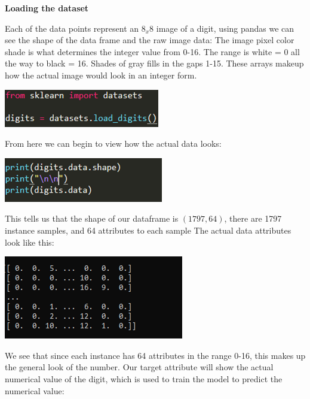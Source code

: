 \documentclass[a4paper,12pt]{report}
\newcommand{\msection}[1]{\noindent\textbf{#1}}
\begin{document}
\msection{Loading the dataset}

Each of the data points represent an $8_x8$ image of a digit, using pandas we can see the shape of the data frame and the raw image data:
The image pixel color shade is what determines the integer value from 0-16. The range is white = 0 all the way to black = 16. Shades of gray fills in the gaps 1-15. These arrays makeup how the actual image would look in an integer form.	

\begin{center}
    \captionsetup{type=figure}
    \includegraphics[width=.5\linewidth]{media/loadDidgit.png}
\end{center}

From here we can  begin to view how the actual data looks:

\begin{center}
    \captionsetup{type=figure}
    \includegraphics[width=.5\linewidth]{media/digitprintpng.png}
\end{center}

This tells us that the shape of our dataframe is $(1797, 64)$, there are 1797 instance samples, and 64 attributes to each sample
The actual data attributes look like this:

\begin{center}
    \captionsetup{type=figure}
    \includegraphics[width=.5\linewidth]{media/digitarrays.png}
\end{center}

We see that since each instance has 64 attributes in the range 0-16, this makes up the general look of the number. Our target attribute will show the actual numerical value of the digit, which is used to train the model to predict the numerical value:
\end{document}
